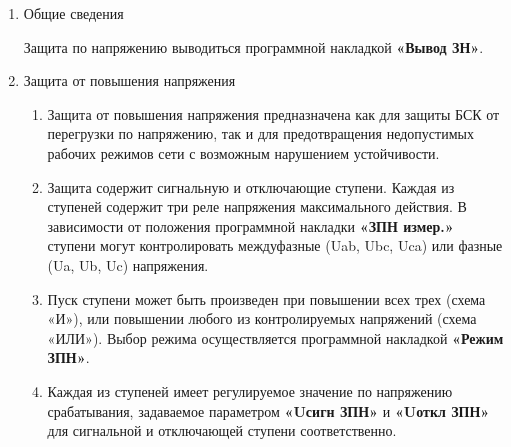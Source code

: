\color{black}

\begin{enumerate}[label=\arabic{section}.\arabic{subsection}.\arabic{enumi}, labelsep=4pt, leftmargin=0pt, itemindent=57pt, itemsep=0pt, parsep=0pt] %

\item Общие сведения
\begin{enumerate}[label=\arabic{section}.\arabic{subsection}.\arabic{enumi}.\arabic*, labelsep=4pt, leftmargin=0em, itemindent=65pt, parsep=0pt]

Защита по напряжению выводиться программной накладкой \textbf{«Вывод ЗН»}. 


\end{enumerate}


\item Защита от повышения напряжения 
\begin{enumerate}[label=\arabic{section}.\arabic{subsection}.\arabic{enumi}.\arabic*, labelsep=4pt, leftmargin=0em, itemindent=65pt, parsep=0pt]


\item
Защита от повышения напряжения предназначена как для защиты БСК от перегрузки по 
напряжению, так и для предотвращения недопустимых рабочих режимов сети с возможным нарушением 
устойчивости. 

\item
Защита содержит сигнальную и отключающие ступени. Каждая из ступеней содержит три реле 
напряжения максимального действия. В зависимости от положения программной накладки 
\textbf{«ЗПН измер.»} ступени могут контролировать междуфазные (Uab, Ubc, Uca) или фазные (Ua, Ub, Uc) 
напряжения. 

\item
Пуск ступени может быть произведен при повышении всех трех (схема «И»), или повышении 
любого из контролируемых напряжений (схема «ИЛИ»). Выбор режима осуществляется программной 
накладкой \textbf{«Режим ЗПН»}. 

\item
Каждая из ступеней имеет регулируемое значение по напряжению срабатывания, задаваемое 
параметром \textbf{«Uсигн ЗПН»} и \textbf{«Uоткл ЗПН»} для сигнальной и отключающей ступени соответственно. 


\end{enumerate}
\end{enumerate}
